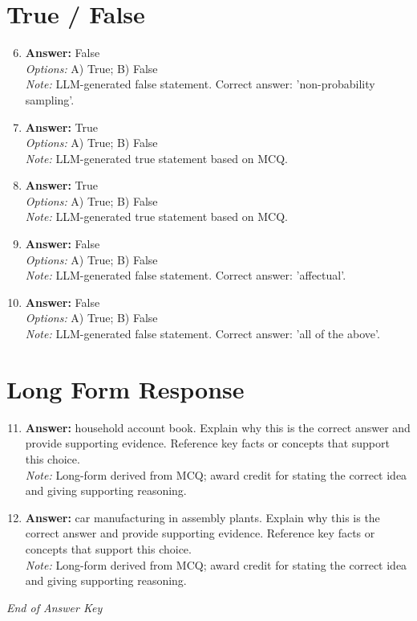 \documentclass[12pt]{article}
\begin{document}
\section*{True / False}
\begin{enumerate}[label=\arabic*.]
\setcounter{enumi}{5}
\item \textbf{Answer:} False
\\ \textit{Options:} A) True; B) False
\\ \textit{Note:} LLM-generated false statement. Correct answer: 'non-probability sampling'.
\item \textbf{Answer:} True
\\ \textit{Options:} A) True; B) False
\\ \textit{Note:} LLM-generated true statement based on MCQ.
\item \textbf{Answer:} True
\\ \textit{Options:} A) True; B) False
\\ \textit{Note:} LLM-generated true statement based on MCQ.
\item \textbf{Answer:} False
\\ \textit{Options:} A) True; B) False
\\ \textit{Note:} LLM-generated false statement. Correct answer: 'affectual'.
\item \textbf{Answer:} False
\\ \textit{Options:} A) True; B) False
\\ \textit{Note:} LLM-generated false statement. Correct answer: 'all of the above'.
\end{enumerate}

\section*{Long Form Response}
\begin{enumerate}[label=\arabic*.]
\setcounter{enumi}{10}
\item \textbf{Answer:} household account book. Explain why this is the correct answer and provide supporting evidence. Reference key facts or concepts that support this choice.
\\ \textit{Note:} Long-form derived from MCQ; award credit for stating the correct idea and giving supporting reasoning.
\item \textbf{Answer:} car manufacturing in assembly plants. Explain why this is the correct answer and provide supporting evidence. Reference key facts or concepts that support this choice.
\\ \textit{Note:} Long-form derived from MCQ; award credit for stating the correct idea and giving supporting reasoning.
\end{enumerate}

\vfill
\noindent\textit{End of Answer Key}
\end{document}
